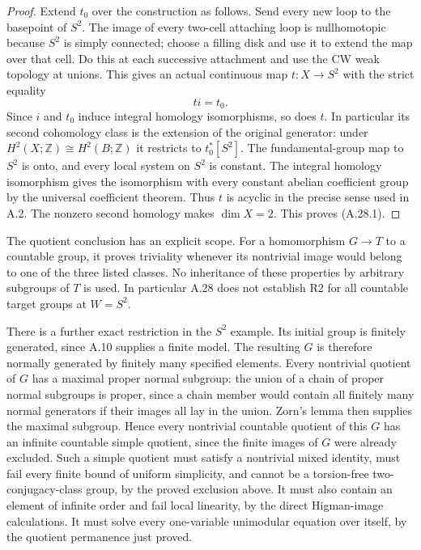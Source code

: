 \begin{proof}
Extend $t_0$ over the construction as follows.
Send every new loop to the basepoint of $S^2$.
The image of every two-cell attaching loop is
nullhomotopic because $S^2$ is simply connected;
choose a filling disk and use it to extend the
map over that cell. Do this at each successive
attachment and use the CW weak topology at
unions. This gives an actual continuous map
$t:X\to S^2$ with the strict equality
\[
 t i=t_0.
 \tag{A.28.6}
\]
Since $i$ and $t_0$ induce integral homology
isomorphisms, so does $t$. In particular its
second cohomology class is the extension of
the original generator: under
$H^2(X;\mathbb Z)\cong H^2(B;\mathbb Z)$ it
restricts to $t_0^*[S^2]$. The fundamental-group
map to $S^2$ is onto, and every local system
on $S^2$ is constant. The integral homology
isomorphism gives the isomorphism with every
constant abelian coefficient group by the
universal coefficient theorem. Thus $t$ is
acyclic in the precise sense used in A.2.
The nonzero second homology makes $\dim X=2$.
This proves (A.28.1).
\end{proof}

The quotient conclusion has an explicit scope.
For a homomorphism $G\to T$ to a countable group,
it proves triviality whenever its nontrivial image
would belong to one of the three listed classes.
No inheritance of these properties by arbitrary
subgroups of $T$ is used. In particular A.28
does not establish R2 for all countable target
groups at $W=S^2$.

There is a further exact restriction in the
$S^2$ example. Its initial group is finitely
generated, since A.10 supplies a finite model.
The resulting $G$ is therefore normally generated
by finitely many specified elements. Every
nontrivial quotient of $G$ has a maximal proper
normal subgroup: the union of a chain of proper
normal subgroups is proper, since a chain member
would contain all finitely many normal generators
if their images all lay in the union. Zorn's
lemma then supplies the maximal subgroup. Hence
every nontrivial countable quotient of this $G$
has an infinite countable simple quotient, since
the finite images of $G$ were already excluded.
Such a simple
quotient must satisfy a nontrivial mixed identity,
must fail every finite bound of uniform simplicity,
and cannot be a torsion-free two-conjugacy-class
group, by the proved exclusion above. It must also
contain an element of infinite order and fail
local linearity, by the direct Higman-image
calculations. It must solve every one-variable
unimodular equation over itself, by the
quotient permanence just proved.
